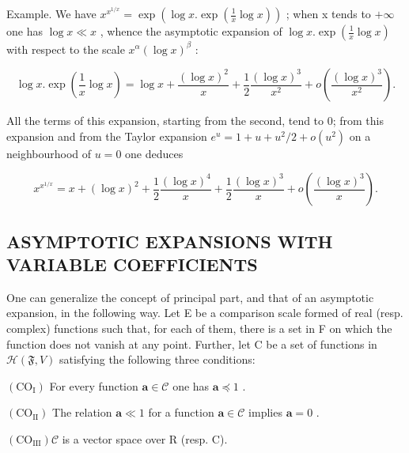 Example. We have \(x^{x^{1/x}} = \exp\left(\log x. \exp\left(\frac{1}{x} \log x\right)\right)\) ; when x tends to \(+\infty\) one has \(\log x \ll x\) , whence the asymptotic expansion of \(\log x. \exp\left(\frac{1}{x} \log x\right)\) with respect to the scale \(x^{\alpha}(\log x)^{\beta}\) :

\[
\log x. \exp \left(\frac {1}{x} \log x\right) = \log x + \frac {(\log x) ^ {2}}{x} + \frac {1}{2} \frac {(\log x) ^ {3}}{x ^ {2}} + o \left(\frac {(\log x) ^ {3}}{x ^ {2}}\right).
\]

All the terms of this expansion, starting from the second, tend to 0; from this expansion and from the Taylor expansion \(e^u = 1 + u + u^2 / 2 + o(u^2)\) on a neighbourhood of \(u = 0\) one deduces

\[
x ^ {x ^ {1 / x}} = x + (\log x) ^ {2} + \frac {1}{2} \frac {(\log x) ^ {4}}{x} + \frac {1}{2} \frac {(\log x) ^ {3}}{x} + o \left(\frac {(\log x) ^ {3}}{x}\right).
\]

\subsection{ASYMPTOTIC EXPANSIONS WITH VARIABLE COEFFICIENTS}

One can generalize the concept of principal part, and that of an asymptotic expansion, in the following way. Let E be a comparison scale formed of real (resp. complex) functions such that, for each of them, there is a set in F on which the function does not vanish at any point. Further, let C be a set of functions in \(\mathcal{H}(\mathfrak{F}, V)\) satisfying the following three conditions:

\((\mathrm{CO}_{\mathrm{I}})\) For every function \(\mathbf{a} \in \mathcal{C}\) one has \(\mathbf{a} \preccurlyeq 1\) .

\((\mathrm{CO}_{\mathrm{II}})\) The relation \(\mathbf{a} \ll 1\) for a function \(\mathbf{a} \in \mathcal{C}\) implies \(\mathbf{a} = 0\) .

\((\mathrm{CO}_{\mathrm{III}})\mathcal{C}\) is a vector space over R (resp. C).

